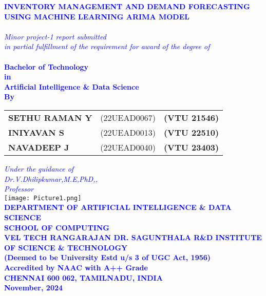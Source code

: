 \documentclass[10pt]{report}
\begin{document}
\newpage
\begin{center}
\thispagestyle{empty}
\LARGE{\textsc {\textbf{\textcolor{blue}{INVENTORY MANAGEMENT AND DEMAND FORECASTING 
USING MACHINE LEARNING ARIMA MODEL}}}}\\[0.2cm]
\vspace{0.2cm}
\Large{\textit{\textcolor{blue}{\\Minor project-1 report submitted \\in partial fulfillment of the
requirement
for award of the degree of}}}\\[0.3cm]
\Large{\textbf{\textcolor{blue}{\\Bachelor of Technology\\in \\Artificial Intelligence \& Data Science}}}
\vspace{0.5cm}
\Large{\textbf{\textcolor{blue}{\\By}}}\\[0.5cm]
\begin{table}[h]
\centering
\Large{\textcolor{blue}{
\begin{tabular}{>{\bfseries}lc>{\bfseries}r}
SETHU RAMAN Y &(22UEAD0067) & (VTU 21546)\\INIYAVAN S & (22UEAD0013)&(VTU 22510)\\NAVADEEP J&(22UEAD0040) & (VTU 23403)\\
\end{tabular}}}
\end{table}
\vspace{0.5cm}
\large{\textit{\textcolor{blue}{Under the guidance of}}}\\
\large{\textit{\textcolor{blue}{Dr.V.Dhilipkumar,M.E,PhD,,\\
Professor}
}}\\
\vspace{0.5cm}
\texttt{[image: Picture1.png]}\\
\vspace{0.5cm}
\large{\textbf{\textcolor{blue}{DEPARTMENT OF ARTIFICIAL INTELLIGENCE \& DATA SCIENCE}}}\\

\large{\textbf{\textcolor{blue}{SCHOOL OF COMPUTING}}}\\
\vspace{0.5cm}
\Large{\textbf{\textcolor{blue}{VEL TECH RANGARAJAN DR. SAGUNTHALA R\&D INSTITUTE OF
SCIENCE \& TECHNOLOGY\\
\vspace{0.2cm}
(Deemed to be University Estd u/s 3 of UGC Act,
1956)}}}\\\Large{\textbf{\textcolor{blue}{Accredited by NAAC with A++ Grade}}}\\
\large{\textbf{\textcolor{blue}{CHENNAI 600 062, TAMILNADU, INDIA}}}
\vspace{0.15cm}
\large{\textbf{\textcolor{blue}{\\November, 2024}}}\\





\end{center}
\end{document}
